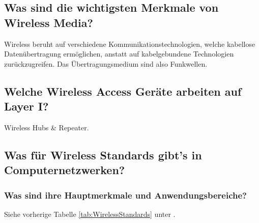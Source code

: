 \subsection*{Was sind die wichtigsten Merkmale von \flqq{}Wireless Media\frqq?}
Wireless beruht auf verschiedene Kommunikationstechnologien, welche kabellose Datenübertragung ermöglichen, anstatt auf kabelgebundene Technologien zurückzugreifen. Das Übertragungsmedium sind also Funkwellen.

\subsection*{Welche Wireless Access Geräte arbeiten auf Layer I?}
Wireless Hubs \& Repeater.

\subsection*{Was für Wireless Standards gibt's in Computernetzwerken?}
\begin{table}[H]
\label{tab:WirelessStandards}
\caption{Wireless Standards und Merkmale}
\end{table}

\subsubsection*{Was sind ihre Hauptmerkmale und Anwendungsbereiche?}
Siehe vorherige Tabelle \ref{tab:WirelessStandards} unter \underline{}.

